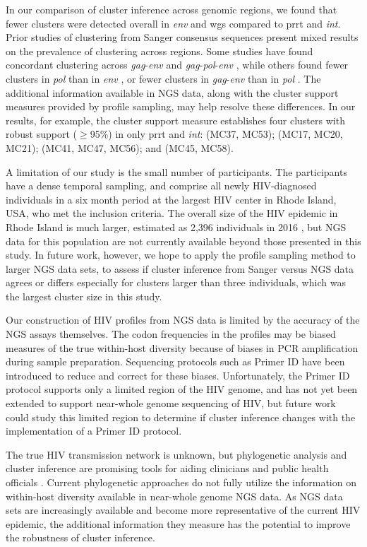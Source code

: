 \documentclass[letterpaper]{article}
\begin{document}
In our comparison of cluster inference across genomic regions, we found that fewer clusters were detected overall in \emph{env} and wgs compared to prrt and \emph{int}. Prior studies of clustering from Sanger consensus sequences present mixed results on the prevalence of clustering across regions. Some studies have found concordant clustering across \emph{gag}-\emph{env} \parencite{han} and \emph{gag}-\emph{pol}-\emph{env} \parencite{english,kaye}, while others found fewer clusters in \emph{pol} than in \emph{env} \parencite{kapaata}, or fewer clusters in \emph{gag}-\emph{env} than in \emph{pol} \parencite{ndiaye}. The additional information available in NGS data, along with the cluster support measures provided by profile sampling, may help resolve these differences. In our results, for example, the cluster support measure establishes four clusters with robust support ($\geq$95\%) in only prrt and \emph{int}: (MC37, MC53); (MC17, MC20, MC21); (MC41, MC47, MC56); and (MC45, MC58).

A limitation of our study is the small number of participants. The participants have a dense temporal sampling, and comprise all newly HIV-diagnosed individuals in a six month period at the largest HIV center in Rhode Island, USA, who met the inclusion criteria. The overall size of the HIV epidemic in Rhode Island is much larger, estimated as 2,396 individuals in 2016 \parencite{ridoh}, but NGS data for this population are not currently available beyond those presented in this study. In future work, however, we hope to apply the profile sampling method to larger NGS data sets, to assess if cluster inference from Sanger versus NGS data agrees or differs especially for clusters larger than three individuals, which was the largest cluster size in this study.

Our construction of HIV profiles from NGS data is limited by the accuracy of the NGS assays themselves. The codon frequencies in the profiles may be biased measures of the true within-host diversity because of biases in PCR amplification during sample preparation. Sequencing protocols such as Primer ID \parencite{jabara} have been introduced to reduce and correct for these biases. Unfortunately, the Primer ID protocol supports only a limited region of the HIV genome, and has not yet been extended to support near-whole genome sequencing of HIV, but future work could study this limited region to determine if cluster inference changes with the implementation of a Primer ID protocol.

The true HIV transmission network is unknown, but phylogenetic analysis and cluster inference are promising tools for aiding clinicians and public health officials \parencite{fauci}. Current phylogenetic approaches do not fully utilize the information on within-host diversity available in near-whole genome NGS data. As NGS data sets are increasingly available and become more representative of the current HIV epidemic, the additional information they measure has the potential to improve the robustness of cluster inference.
\end{document}
